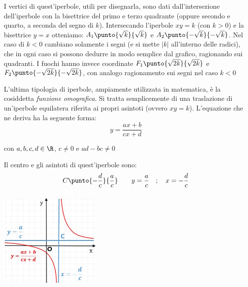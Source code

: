 I vertici di quest'iperbole, utili per disegnarla, sono dati 
dall'intersezione dell'iperbole con la bisettrice del primo e terzo 
quadrante (oppure secondo e quarto, a seconda del segno di \(k\)). 
Intersecando l'iperbole \(xy=k\) (con \(k>0\))
e la bisettrice \(y=x\) otteniamo: \(A_{1} \punto{\sqrt{k}}{\sqrt{k}}\) e 
\(A_{2} \punto{- \sqrt{k}}{-\sqrt{k}}\). Nel caso di \(k<0\) cambiano 
solamente i segni (e si mette \(|k|\) all'interno delle radici), che in ogni 
caso si possono dedurre in modo semplice dal grafico, ragionando sui quadranti. 
I fuochi hanno invece coordinate
\(F_1 \punto{\sqrt{2k}}{\sqrt{2k}}\) e \(F_2 \punto{-\sqrt{2k}}{-\sqrt{2k}}
\), 
con analogo ragionamento sui segni nel caso \(k<0\)


\noindent\begin{minipage}{.6\textwidth}
L'ultima tipologia di iperbole, ampiamente utilizzata in matematica,
è la cosiddetta \emph{funzione omografica}. Si tratta semplicemente di
una traslazione di un'iperbole equilatera riferita ai propri asintoti (ovvero 
\(xy=k\)).
L'equazione che ne deriva ha la seguente forma:
\begin{equation*}
y= \dfrac{ax+b}{cx+d}
\end{equation*}

con \(a,b,c,d\in \R\), \(c \neq 0\) e \( ad-bc \neq 0\)

Il centro e gli asintoti di quest'iperbole sono:
\[C \punto{-\dfrac{d}{c}}{\dfrac{a}{c}} \qquad y= \dfrac{a}{c} \quad; \quad  x=-\dfrac{d}{c}\]
\end{minipage}
\hfill
\begin{minipage}{.35\textwidth}
  \centering
  \includegraphics[height=5cm, width=5cm]{img/omografica.jpg}
\end{minipage}

